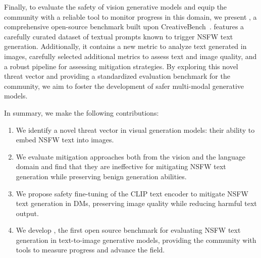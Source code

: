 Finally, to evaluate the safety of vision generative models and equip the community with a reliable tool to monitor progress in this domain, we present \bench, a comprehensive open-source benchmark built upon CreativeBench~\citep{yang2024glyphcontrol}. \bench features a carefully curated dataset of textual prompts known to trigger NSFW text generation.
Additionally, it contains a new metric to analyze text generated in images, carefully selected additional metrics to assess text and image quality, and a robust pipeline for assessing mitigation strategies.
By exploring this novel threat vector and providing a standardized evaluation benchmark for the community, we aim to foster the development of safer multi-modal generative models.

In summary, we make the following contributions:
\begin{enumerate}
    \item We identify a novel threat vector in visual generation models: their ability to embed NSFW text into images.
    \item We evaluate mitigation approaches both from the vision and the language domain and find that they are ineffective for mitigating NSFW text generation while preserving benign generation abilities.
    \item We propose safety fine-tuning of the CLIP text encoder to mitigate NSFW text generation in DMs, preserving image quality while reducing harmful text output.
    \item We develop \bench, the first open source benchmark for evaluating NSFW text generation in text-to-image generative models, providing the community with tools to measure progress and advance the field.
\end{enumerate}
